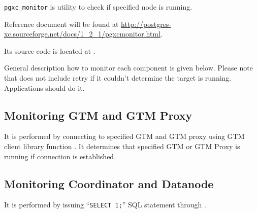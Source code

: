 %
%

  {\tt pgxc\_monitor} is \XC{} utility to check if specified node is running.
  
  Reference document will be found at
  \url{http://postgres-xc.sourceforge.net/docs/1_2_1/pgxcmonitor.html}.
  
  Its source code is located at .
  
  General description how to monitor each component is given below.
  Please note that  does not include retry if it couldn't determine
  the target is running.
  Applications should do it.



\subsection{Monitoring GTM and GTM Proxy}

  It is performed by connecting to specified GTM and GTM proxy using GTM client library
  function .
  It determines that specified GTM or GTM Proxy is running if connection is established.



\subsection{Monitoring Coordinator and Datanode}

  It is performed by issuing ``\texttt{SELECT 1;}'' SQL statement through .


